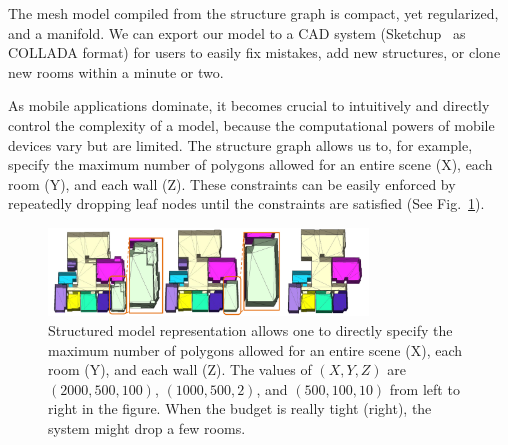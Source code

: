  The mesh model compiled from the structure
graph is compact, yet regularized, and a manifold. We can export our
model to a CAD system (\eg Sketchup~\cite{sketchup} as COLLADA format)
for users to easily fix mistakes, add new structures, or clone new rooms
within a minute or two.

 As mobile applications
dominate, it becomes crucial to intuitively and directly control the
complexity of a model, because the computational powers of mobile
devices vary but are limited.
The structure graph allows us to,
for example, specify the maximum number of polygons allowed for an entire
scene (X), each room (Y), and each wall (Z). These constraints can be
easily enforced by repeatedly dropping leaf nodes until the constraints
are satisfied
(See Fig.~\ref{fig:complexity_control}).
\begin{figure}[!t]
\begin{center}
\includegraphics[width=85mm]{../figures/complexity2.pdf}
\end{center}
 \vspace{-0.2cm}
\caption{Structured model representation allows one to
 directly specify the
 maximum number of polygons allowed for an entire scene (X), each room
 (Y), and each wall (Z). The values of $(X,Y,Z)$ are $(2000,500,100)$,
 $(1000, 500, 2)$, and $(500, 100, 10)$ from left to right in the figure.
 When the budget is really tight (right), the
 system might drop a few rooms. %
 }
\label{fig:complexity_control}
 \vspace{-0.25cm}
\end{figure}

